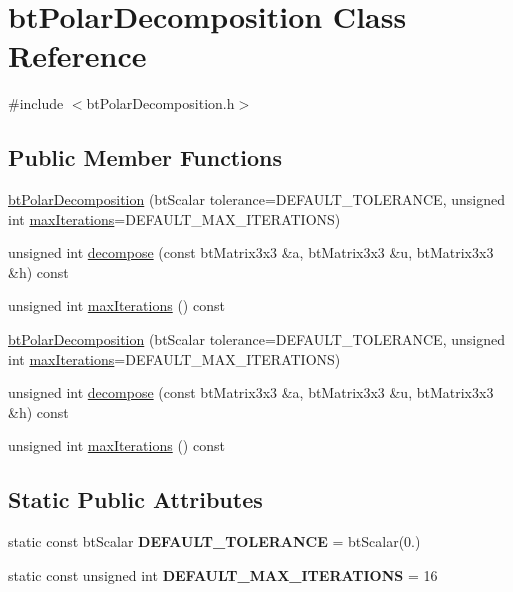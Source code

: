 \hypertarget{classbtPolarDecomposition}{}\section{bt\+Polar\+Decomposition Class Reference}
\label{classbtPolarDecomposition}


{\ttfamily \#include $<$bt\+Polar\+Decomposition.\+h$>$}

\subsection*{Public Member Functions}
\begin{DoxyCompactItemize}
\item 
\hyperlink{classbtPolarDecomposition_aa346e3dcc8867ebd3944b51ab5b7fb1f}{bt\+Polar\+Decomposition} (bt\+Scalar tolerance=D\+E\+F\+A\+U\+L\+T\+\_\+\+T\+O\+L\+E\+R\+A\+N\+CE, unsigned int \hyperlink{classbtPolarDecomposition_ad463b266ff54e51c92d8c8786d4d843f}{max\+Iterations}=D\+E\+F\+A\+U\+L\+T\+\_\+\+M\+A\+X\+\_\+\+I\+T\+E\+R\+A\+T\+I\+O\+NS)
\item 
unsigned int \hyperlink{classbtPolarDecomposition_a1f9cd6a03f284aa2fa6b1995f4ebf332}{decompose} (const bt\+Matrix3x3 \&a, bt\+Matrix3x3 \&u, bt\+Matrix3x3 \&h) const
\item 
unsigned int \hyperlink{classbtPolarDecomposition_ad463b266ff54e51c92d8c8786d4d843f}{max\+Iterations} () const
\item 
\hyperlink{classbtPolarDecomposition_aa346e3dcc8867ebd3944b51ab5b7fb1f}{bt\+Polar\+Decomposition} (bt\+Scalar tolerance=D\+E\+F\+A\+U\+L\+T\+\_\+\+T\+O\+L\+E\+R\+A\+N\+CE, unsigned int \hyperlink{classbtPolarDecomposition_ad463b266ff54e51c92d8c8786d4d843f}{max\+Iterations}=D\+E\+F\+A\+U\+L\+T\+\_\+\+M\+A\+X\+\_\+\+I\+T\+E\+R\+A\+T\+I\+O\+NS)
\item 
unsigned int \hyperlink{classbtPolarDecomposition_a1f9cd6a03f284aa2fa6b1995f4ebf332}{decompose} (const bt\+Matrix3x3 \&a, bt\+Matrix3x3 \&u, bt\+Matrix3x3 \&h) const
\item 
unsigned int \hyperlink{classbtPolarDecomposition_ad463b266ff54e51c92d8c8786d4d843f}{max\+Iterations} () const
\end{DoxyCompactItemize}
\subsection*{Static Public Attributes}
\begin{DoxyCompactItemize}
\item 
\mbox{\label{classbtPolarDecomposition_a58f4b00f89086019bcc4d45d55c1ca3a}} 
static const bt\+Scalar {\bfseries D\+E\+F\+A\+U\+L\+T\+\_\+\+T\+O\+L\+E\+R\+A\+N\+CE} = bt\+Scalar(0.)
\item 
\mbox{\label{classbtPolarDecomposition_aa8d542c27b8c088d90d26330b4bb05f7}} 
static const unsigned int {\bfseries D\+E\+F\+A\+U\+L\+T\+\_\+\+M\+A\+X\+\_\+\+I\+T\+E\+R\+A\+T\+I\+O\+NS} = 16
\end{DoxyCompactItemize}


